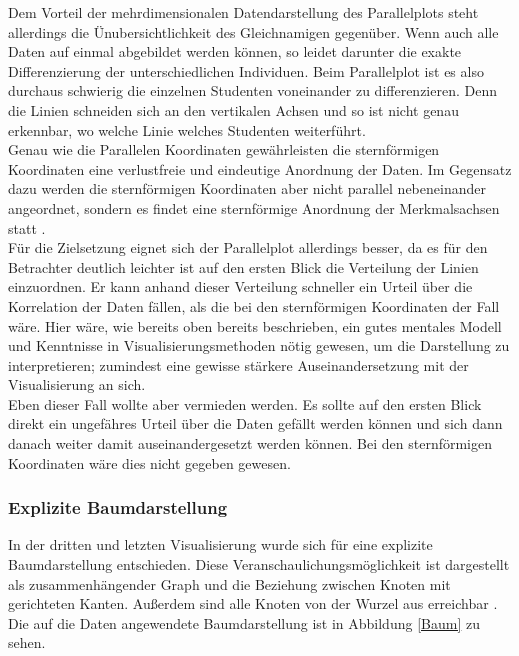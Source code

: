 \documentclass[usegeometry=true]{scrartcl}
\begin{document}
\noindent Dem Vorteil der mehrdimensionalen Datendarstellung des Parallelplots steht allerdings die Ünubersichtlichkeit des Gleichnamigen gegenüber. Wenn auch alle Daten auf einmal abgebildet werden können, so leidet darunter die exakte Differenzierung der unterschiedlichen Individuen. Beim Parallelplot ist es also durchaus schwierig die einzelnen Studenten voneinander zu differenzieren. Denn die Linien schneiden sich an den vertikalen Achsen und so ist nicht genau erkennbar, wo welche Linie welches Studenten weiterführt.\\ %


\noindent Genau wie die Parallelen Koordinaten gewährleisten die sternförmigen Koordinaten eine verlustfreie und eindeutige Anordnung der Daten. Im Gegensatz dazu werden die sternförmigen Koordinaten aber nicht parallel nebeneinander angeordnet, sondern es findet eine sternförmige Anordnung der Merkmalsachsen statt \cite{Doerner0304}.\\
Für die Zielsetzung eignet sich der Parallelplot allerdings besser, da es für den Betrachter deutlich leichter ist auf den ersten Blick die Verteilung der Linien einzuordnen. Er kann anhand dieser Verteilung schneller ein Urteil über die Korrelation der Daten fällen, als die bei den sternförmigen Koordinaten der Fall wäre. Hier wäre, wie bereits oben bereits beschrieben, ein gutes mentales Modell und Kenntnisse in Visualisierungsmethoden nötig gewesen, um die Darstellung zu interpretieren; zumindest eine gewisse stärkere Auseinandersetzung mit der Visualisierung an sich.\\

\noindent Eben dieser Fall wollte aber vermieden werden. Es sollte auf den ersten Blick direkt ein ungefähres Urteil über die Daten gefällt werden können und sich dann danach weiter damit auseinandergesetzt werden können. Bei den sternförmigen Koordinaten wäre dies nicht gegeben gewesen. 


\subsubsection{Explizite Baumdarstellung}
\label{VisDrei}
In der dritten und letzten Visualisierung wurde sich für eine explizite Baumdarstellung entschieden. Diese Veranschaulichungsmöglichkeit ist dargestellt als zusammenhängender Graph und die Beziehung zwischen Knoten mit gerichteten Kanten. Außerdem sind alle Knoten von der Wurzel aus erreichbar \cite{Hinneburg2022}.\\
Die auf die Daten angewendete Baumdarstellung ist in Abbildung \ref{Baum} zu sehen.
\end{document}
